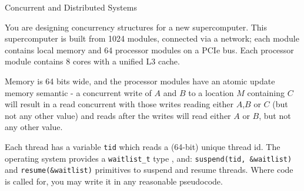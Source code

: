 \documentclass{tripos}  %
\begin{document}
\begin{question}[MockIB,year=2024,paper=1,question=1,author=rrw]{Concurrent and Distributed Systems}


You are designing concurrency structures for a new supercomputer. This supercomputer is built from 1024 modules, connected via a network; each module contains local memory and 64 processor modules on a PCIe bus. Each processor module contains 8 cores with a unified L3 cache.

Memory is 64 bits wide, and the processor modules have an atomic update memory semantic - a concurrent write of $A$ and $B$ to a location $M$ containing $C$ will result in a read concurrent with those writes reading either $A$,$B$ or $C$ (but not any other value) and reads after the writes will read either $A$ or $B$, but not any other value.

Each thread has a variable {\tt tid} which reads a (64-bit) unique thread id. The operating system provides a {\tt waitlist_t} type , and:
{\tt suspend(tid, &waitlist)} and {\tt resume(&waitlist)} primitives to suspend and resume threads. Where code is called for, you may write it in any reasonable pseudocode.


\end{question}
\end{document}
